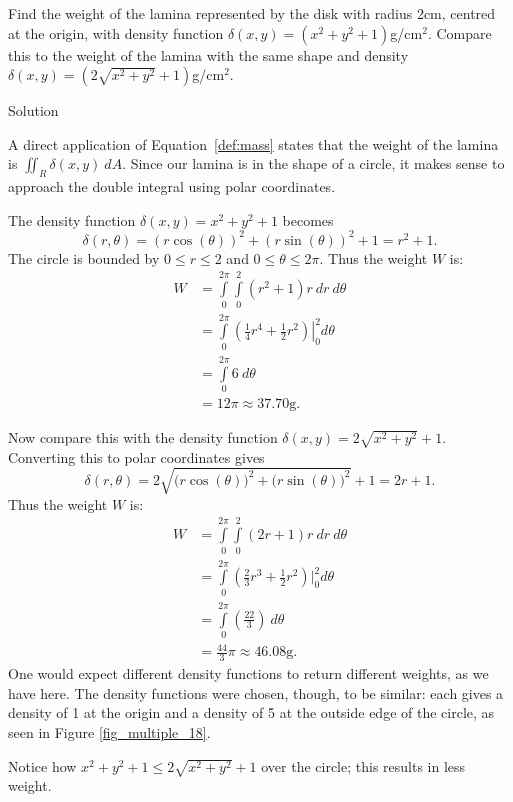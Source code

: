 \begin{example}\label{ex_mass3}
Find the weight of the lamina represented by the disk with radius 2cm, centred at the origin, with density function $\delta(x,y) = (x^2+y^2+1)$g/cm$^2$. Compare this to the weight of the lamina with the same shape and density $\delta(x,y) = (2\sqrt{x^2+y^2}+1)$g/cm$^2$.

Solution 

A direct application of Equation~\eqref{def:mass} states that the weight of the lamina is $\iint_R\delta(x,y)\ dA$. Since our lamina is in the shape of a circle, it makes sense to approach the double integral using polar coordinates.

The density function $\delta(x,y) = x^2+y^2+1$ becomes $$\delta(r,\theta) = (r\cos(\theta))^2+(r\sin(\theta))^2+1 = r^2+1.$$ The circle is bounded by $0\leq r\leq 2$ and $0\leq\theta\leq2\pi$. Thus the weight $W$ is:
\allowdisplaybreaks
\begin{align*}
W &= \int\limits_0^{2\pi}\int\limits_0^2 (r^2+1)r\ dr\ d\theta\\
	&= \int\limits_0^{2\pi} \left.\left(\frac14r^4+\frac12r^2\right)\right|_0^2d\theta\\
	&= \int\limits_0^{2\pi} 6 \ d\theta\\
	&= 12\pi \approx 37.70\text{g}.
\end{align*}

Now compare this with the density function $\delta(x,y) = 2\sqrt{x^2+y^2}+1$. Converting this to polar coordinates gives $$\delta(r,\theta) = 2\sqrt{\Big(r\cos(\theta)\Big)^2+\Big(r\sin(\theta)\Big)^2}+1 = 2r+1.$$ Thus the weight $W$ is:
\begin{align*}
W &= \int\limits_0^{2\pi}\int\limits_0^2 (2r+1)r\ dr\ d\theta\\
	&= \int\limits_0^{2\pi} \left(\frac23r^3+\frac12r^2\right)\Big|_0^2d\theta\\
	&= \int\limits_0^{2\pi} \left(\frac{22}3\right)\ d\theta\\
	&= \frac{44}3\pi \approx 46.08\text{g}.
\end{align*}
One would expect different density functions to return different weights, as we have here. The density functions were chosen, though, to be similar: each gives a density of 1 at the origin and a density of 5 at the outside edge of the circle, as seen in Figure \ref{fig_multiple_18}.


Notice how $x^2+y^2+1 \leq 2\sqrt{x^2+y^2}+1$ over the circle; this results in less weight.
\end{example}

